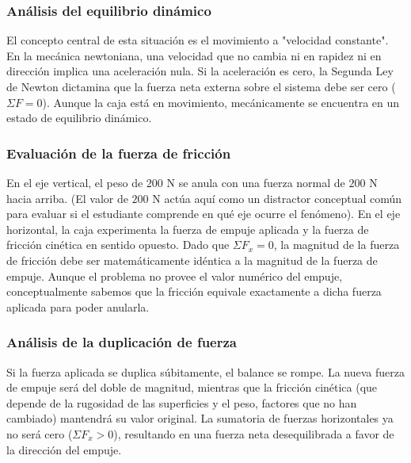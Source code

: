 \documentclass[12pt, a4paper]{article}
\begin{document}
\subsubsection*{Análisis del equilibrio dinámico}
El concepto central de esta situación es el movimiento a "velocidad constante". En la mecánica newtoniana, una velocidad que no cambia ni en rapidez ni en dirección implica una aceleración nula. Si la aceleración es cero, la Segunda Ley de Newton dictamina que la fuerza neta externa sobre el sistema debe ser cero ($\Sigma F = 0$). Aunque la caja está en movimiento, mecánicamente se encuentra en un estado de equilibrio dinámico.

\subsubsection*{Evaluación de la fuerza de fricción}
En el eje vertical, el peso de $200 \text{ N}$ se anula con una fuerza normal de $200 \text{ N}$ hacia arriba. (El valor de $200 \text{ N}$ actúa aquí como un distractor conceptual común para evaluar si el estudiante comprende en qué eje ocurre el fenómeno).
En el eje horizontal, la caja experimenta la fuerza de empuje aplicada y la fuerza de fricción cinética en sentido opuesto. Dado que $\Sigma F_x = 0$, la magnitud de la fuerza de fricción debe ser matemáticamente idéntica a la magnitud de la fuerza de empuje. Aunque el problema no provee el valor numérico del empuje, conceptualmente sabemos que la fricción equivale exactamente a dicha fuerza aplicada para poder anularla.

\subsubsection*{Análisis de la duplicación de fuerza}
Si la fuerza aplicada se duplica súbitamente, el balance se rompe. La nueva fuerza de empuje será del doble de magnitud, mientras que la fricción cinética (que depende de la rugosidad de las superficies y el peso, factores que no han cambiado) mantendrá su valor original. La sumatoria de fuerzas horizontales ya no será cero ($\Sigma F_x > 0$), resultando en una fuerza neta desequilibrada a favor de la dirección del empuje.
\end{document}
